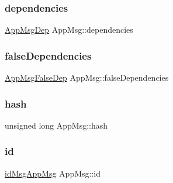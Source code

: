 \subsubsection{\texorpdfstring{dependencies}{dependencies}}
{\footnotesize\ttfamily \hyperlink{AppMsg__m_8h_a39bb58326d7e24febcd7397c022ada6a}{App\+Msg\+Dep} App\+Msg\+::dependencies\hspace{0.3cm}{\ttfamily [protected]}}

\mbox{\label{classAppMsg_a2e1c93236ae4ceb0fc5571a5b044c454}} 
\subsubsection{\texorpdfstring{false\+Dependencies}{falseDependencies}}
{\footnotesize\ttfamily \hyperlink{AppMsg__m_8h_a2b8cadfd13c916ddccf5a213ca34d8ee}{App\+Msg\+False\+Dep} App\+Msg\+::false\+Dependencies\hspace{0.3cm}{\ttfamily [protected]}}

\mbox{\label{classAppMsg_a8b73e331d42d97d9e51603dc5352307f}} 
\subsubsection{\texorpdfstring{hash}{hash}}
{\footnotesize\ttfamily unsigned long App\+Msg\+::hash\hspace{0.3cm}{\ttfamily [protected]}}

\mbox{\label{classAppMsg_aadaa93732c4df84c8b2ef13d7199f9a1}} 
\subsubsection{\texorpdfstring{id}{id}}
{\footnotesize\ttfamily \hyperlink{AppMsg__m_8h_a0bd5e3a5ba85ac1fa0fd0fae34d903c1}{id\+Msg\+App\+Msg} App\+Msg\+::id\hspace{0.3cm}{\ttfamily [protected]}}

\mbox{\label{classAppMsg_a0dceb6642736a90673422df92ab3d788}} 
